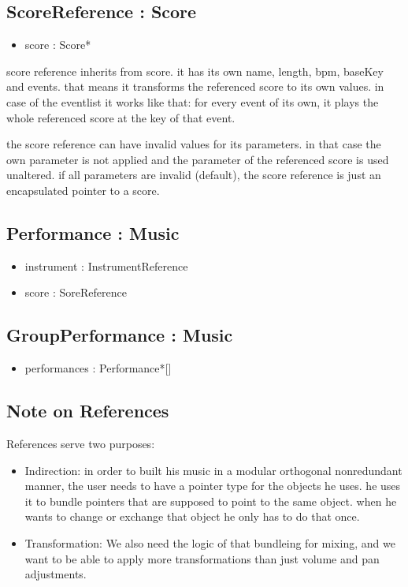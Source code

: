 \documentclass[12pt]{article}
\begin{document}
\subsection*{ScoreReference : Score}
\begin{itemize}
\item score : Score*
\end{itemize}

score reference inherits from score. it has its own name, length, bpm, baseKey and events.
that means it transforms the referenced score to its own values. in case of the eventlist it works like that: for every event of its own, it plays the whole referenced score at the key of that event.

the score reference can have invalid values for its parameters. in that case the own parameter is not applied and the parameter of the referenced score is used unaltered. if all parameters are invalid (default), the score reference is just an encapsulated pointer to a score.

\subsection*{Performance : Music}
\begin{itemize}
\item instrument : InstrumentReference
\item score : SoreReference
\end{itemize}

\subsection*{GroupPerformance : Music}
\begin{itemize}
\item performances : Performance*[]
\end{itemize}

\subsection{Note on References}
References serve two purposes:
\begin{itemize}
\item Indirection: in order to built his music in a modular orthogonal nonredundant manner, the user needs to have a pointer type for the objects he uses. he uses it to bundle pointers that are supposed to point to the same object. when he wants to change or exchange that object he only has to do that once.
\item Transformation: We also need the logic of that bundleing for mixing, and we want to be able to apply more transformations than just volume and pan adjustments.
\end{itemize}
\end{document}
